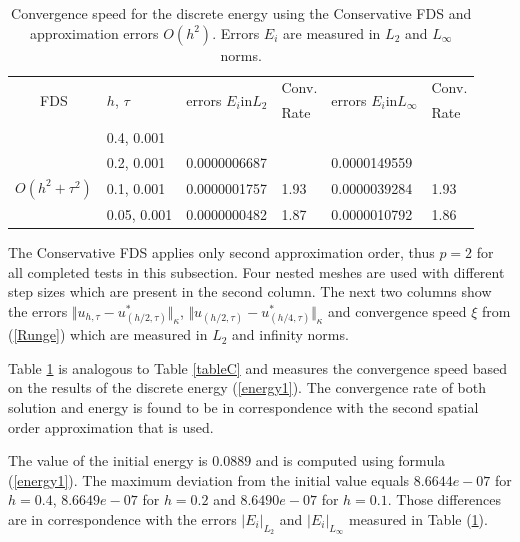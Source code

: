\documentclass[%
 aip,
cp,  
 amsmath,amssymb,
 reprint,
]{iopconfser}
\newcommand{\rf}[1]{(\ref{#1})}
\begin{document}
\begin{table}[ht]
\centering
\small
		\begin{tabular}{||c|l|ll|ll||}
			\hline
			\hline
      \multirow{2  }{*}{FDS}        & \multirow{2  }{*}{$h$, $\tau$}  & \multirow{2  }{*}{errors $E_i$in$L_2$}  &Conv.& \multirow{2  }{*}{errors $E_i$in$L_\infty$}  &Conv.  \\
	                                        &                                                     &                                                                 &  Rate &                                                                       & Rate \\
   			\hline 
					\hline 
                                   &0.4, 0.001         &                    &                &                  &                   \\
                                   &0.2, 0.001        & 0.0000006687  &                & 0.0000149559   &                   \\
     $O(h^2 + \tau^ 2)$ &0.1, 0.001      & 0.0000001757   & 1.93       & 0.0000039284 & 1.93   \\
                                     &0.05, 0.001  & 0.0000000482   & 1.87       & 0.0000010792  & 1.86   \\
	   \hline
			\hline 
		\end{tabular}
		\caption{ Convergence speed for the discrete energy using the Conservative FDS and approximation errors $O(h^{2})$. Errors $E_i$ are measured in $L_2$ and $L_\infty$ norms. }
\label{tableD}
\end{table}
The Conservative FDS applies only second approximation order, thus $p=2$ for all completed tests in this subsection. Four nested meshes are used with different step sizes which are present in the second column. The next two columns show the errors $\Vert u_{h,\tau} - u^*_{(h/2,\tau)} \Vert_\kappa$, $\Vert  u_{(h/2,\tau)} - u^*_{(h/4,\tau)} \Vert_\kappa$ and convergence speed $\xi$ from \rf{Runge} which are measured in $L_2$ and infinity norms. 

Table \ref{tableD} is analogous to Table \ref{tableC} and measures the convergence speed based on the results of the discrete energy \rf{energy1}. The convergence rate of both solution and energy is found to be in correspondence with the second spatial order approximation that is used.

The value of the initial energy is $0.0889$ and is computed using formula \rf{energy1}. The maximum deviation from the initial value equals $8.6644e-07$ for $h=0.4$, $8.6649e-07$ for $h=0.2$ and $8.6490e-07$ for $h=0.1$. Those differences are in correspondence with the errors $|E_i|_{L_2}$ and $|E_i|_{L_\infty}$ measured in Table \rf{tableD}.
\end{document}
